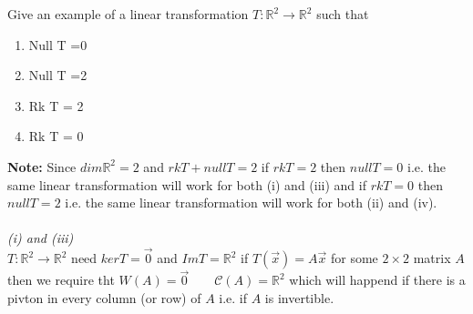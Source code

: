 \documentclass{report}
\begin{document}
{    
    \hline
    Give an example of a linear transformation $ T: \mathbb{R} ^2 \to \mathbb{R} ^2$ such that 
    \begin{enumerate}[label=(\roman*)]
      \item Null T =0
      \item Null T =2
      \item Rk T = 2
      \item Rk T = 0
      \end{enumerate}
       \textbf{Note:} Since $ dim \mathbb{R}^2 =2$ and $ rk T + null T = 2$ if $ rk T =2 $ then $ null T = 0$ i.e. the same linear transformation will work for both (i) and (iii) and if $ rk T =0$ then $ null T = 2$ i.e. the same linear transformation will work for both (ii) and (iv).\\
       \\
       \textit{ (i) and (iii) }\\
       $ T : \mathbb{R} ^2 \to \mathbb{R} ^2$ need $ ker T = { \vec{ 0} }$ and $ Im T = \mathbb{R} ^2$ if $ T \left(  \vec{ x}  \right) = A \vec{ x} $ for some $ 2 \times  2$  matrix $ A$ then we require tht $ W \left( A \right) = {\vec{ 0} } \qquad  \mathcal{C} \left( A \right) = \mathbb{R} ^2$ which will happend if there is a pivton in every column (or row) of $ A$  i.e.  if $ A$ is invertible.\\
    
}
\end{document}
